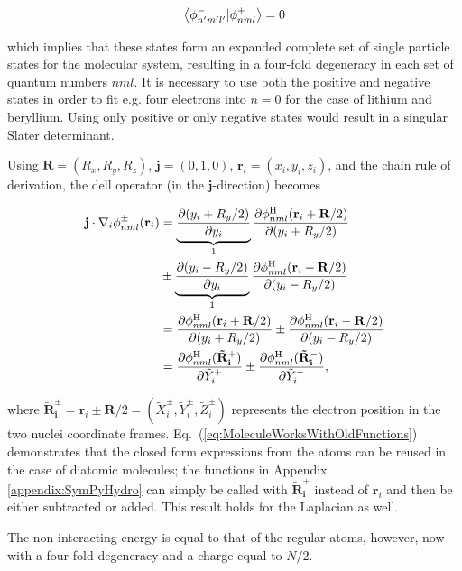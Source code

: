 \begin{equation}
 \left\langle \phi_{n'm'l'}^- | \phi_{nml}^+\right\rangle = 0
\end{equation}

which implies that these states form an expanded complete set of single particle states for the molecular system, resulting in a four-fold degeneracy in each set of quantum numbers $nml$. It is necessary to use both the positive and negative states in order to fit e.g. four electrons into $n=0$ for the case of lithium and beryllium. Using only positive or only negative states would result in a singular Slater determinant.

Using $\mathbf{R} = \left(R_x, R_y, R_z\right)$, $\mathbf{j} = (0, 1, 0)$, $\mathbf{r}_i = \left(x_i, y_i, z_i\right)$,  and the chain rule of derivation, the dell operator (in the $\mathbf{j}$-direction) becomes

\begin{align}
 \mathbf{j}\cdot \nabla_i \phi_{nml}^\pm (\mathbf{r}_i) &= \underbrace{\frac{\partial (y_i + R_y/2)}{\partial y_i}}_{1}\frac{\partial \phi_{nml}^\mathrm{H}(\mathbf{r}_i + \mathbf{R}/2)}{\partial (y_i + R_y/2)} \notag \\
  &\pm \underbrace{\frac{\partial (y_i - R_y/2)}{\partial y_i}}_{1}\frac{\partial \phi_{nml}^\mathrm{H}(\mathbf{r}_i - \mathbf{R}/2)}{\partial (y_i - R_y/2)} \notag\\
  &= \frac{\partial \phi_{nml}^\mathrm{H}(\mathbf{r}_i + \mathbf{R}/2)}{\partial (y_i + R_y/2)} \pm \frac{\partial \phi_{nml}^\mathrm{H}(\mathbf{r}_i - \mathbf{R}/2)}{\partial (y_i - R_y/2)} \notag\\
  &=  \frac{\partial \phi_{nml}^\mathrm{H}(\mathbf{\tilde R_i^+})}{\partial \tilde Y_i^+} \pm \frac{\partial \phi_{nml}^\mathrm{H}(\mathbf{\tilde R_i^-})}{\partial \tilde Y_i^-}, \label{eq:MoleculeWorksWithOldFunctions}
\end{align}

where $\mathbf{\tilde R_i^\pm} = \mathbf{r}_i \pm \mathbf{R}/2 = (\tilde X_i^\pm, \tilde Y_i^\pm, \tilde Z_i^\pm)$ represents the electron position in the two nuclei coordinate frames. Eq.~(\ref{eq:MoleculeWorksWithOldFunctions}) demonstrates that the closed form expressions from the atoms can be reused in the case of diatomic molecules; the functions in Appendix \ref{appendix:SymPyHydro} can simply be called  with $\mathbf{\tilde R_i^\pm}$ instead of $\mathbf{r}_i$ and then be either subtracted or added. This result holds for the Laplacian as well.

The non-interacting energy is equal to that of the regular atoms, however, now with a four-fold degeneracy and a charge equal to $N/2$.


